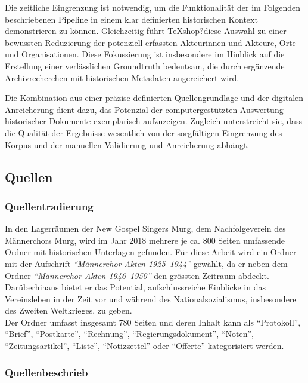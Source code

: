 \documentclass[12pt, a4paper, ngerman, bidi=default]{article}
\begin{document}
Die zeitliche Eingrenzung ist notwendig, um die Funktionalität der im Folgenden beschriebenen Pipeline 
in einem klar definierten historischen Kontext demonstrieren zu können. Gleichzeitig führt TeXshop?diese Auswahl zu einer 
bewussten Reduzierung der potenziell erfassten Akteurinnen und Akteure, Orte und Organisationen. Diese Fokussierung ist 
insbesondere im Hinblick auf die Erstellung einer verlässlichen Groundtruth bedeutsam, die durch ergänzende Archivrecherchen 
mit historischen Metadaten angereichert wird.

Die Kombination aus einer präzise definierten Quellengrundlage und der digitalen Anreicherung dient dazu, das 
Potenzial der computergestützten Auswertung historischer Dokumente exemplarisch aufzuzeigen. 
Zugleich unterstreicht sie, dass die Qualität der Ergebnisse wesentlich von der sorgfältigen Eingrenzung 
des Korpus und der manuellen Validierung und Anreicherung abhängt.

\subsection{Quellen}
\subsubsection{Quellentradierung}
In den Lagerräumen der New Gospel Singers Murg, dem Nachfolgeverein des Männerchors Murg, 
wird im Jahr 2018 mehrere je ca. 800 Seiten umfassende Ordner mit historischen Unterlagen gefunden. 
Für diese Arbeit wird ein Ordner mit der Aufschrift \textit{\enquote{Männerchor Akten 1925--1944}} gewählt, da er neben dem Ordner 
\textit{\enquote{Männerchor Akten 1946--1950}} den grössten Zeitraum abdeckt. Darüberhinaus bietet er das Potential, 
aufschlussreiche Einblicke in das Vereinsleben in der Zeit vor und während des Nationalsozialismus, insbesondere des Zweiten Weltkrieges, zu geben.\\ 
Der Ordner umfasst insgesamt 780 Seiten und deren Inhalt kann als \enquote{Protokoll}, \enquote{Brief}, \enquote{Postkarte}, \enquote{Rechnung}, 
\enquote{Regierungsdokument}, \enquote{Noten}, \enquote{Zeitungsartikel}, \enquote{Liste}, \enquote{Notizzettel} oder \enquote{Offerte} kategorisiert werden.


\subsubsection{Quellenbeschrieb}
\end{document}
